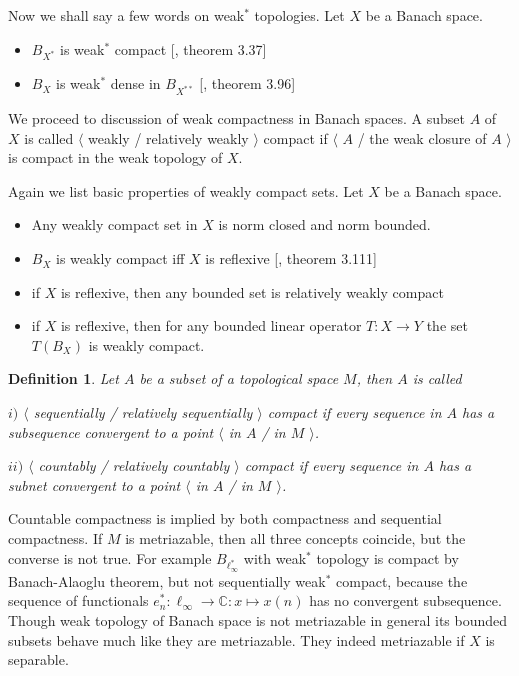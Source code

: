 \documentclass[12pt]{article}
\newtheorem{definition}[theorem]{Definition}
\begin{document}
Now we shall say a few words on weak${}^*$ topologies. Let $X$ be a Banach space.

\begin{itemize}

\item $B_{X^*}$ is weak${}^*$ compact [\cite{FabHabBanSpTh}, theorem 3.37]

\item $B_X$ is weak${}^*$ dense in $B_{X^{**}}$ [\cite{FabHabBanSpTh}, theorem 3.96]

\end{itemize}

We proceed to discussion of weak compactness in Banach spaces. A subset $A$ of $X$ is called $\langle$ weakly / relatively weakly $\rangle$ compact if $\langle$ $A$ / the weak closure of $A$ $\rangle$ is compact in the weak topology of $X$.

Again we list basic properties of weakly compact sets. Let $X$ be a Banach space.

\begin{itemize}

\item Any weakly compact set in $X$ is norm closed and norm bounded.

\item $B_X$ is weakly compact iff $X$ is reflexive [\cite{FabHabBanSpTh}, theorem 3.111]

\item if $X$ is reflexive, then any bounded set is relatively weakly compact

\item if $X$ is reflexive, then for any bounded linear operator $T:X\to Y$ the set $T(B_X)$ is weakly compact.

\end{itemize}

\begin{definition} Let $A$ be a subset of a topological space $M$, then $A$ is called

$i)$ $\langle$ sequentially / relatively sequentially $\rangle$ compact if every sequence in $A$ has a subsequence convergent to a point $\langle$ in $A$ / in $M$ $\rangle$.

$ii)$ $\langle$ countably / relatively countably $\rangle$ compact if every sequence in $A$ has a subnet convergent to a point $\langle$ in $A$ / in $M$ $\rangle$.
\end{definition}

Countable compactness is implied by both compactness and sequential compactness. If $M$ is metriazable, then all three concepts coincide, but the converse is not true. For example $B_{\ell_\infty^*}$ with weak${}^*$ topology is compact by Banach-Alaoglu theorem, but not sequentially weak${}^*$ compact, because the sequence of functionals $e_n^*:\ell_\infty\to\mathbb{C}:x\mapsto x(n)$ has no convergent subsequence. Though weak topology of Banach space is not metriazable in general its bounded subsets behave much like they are metriazable. They indeed metriazable if $X$ is separable.
\end{document}
